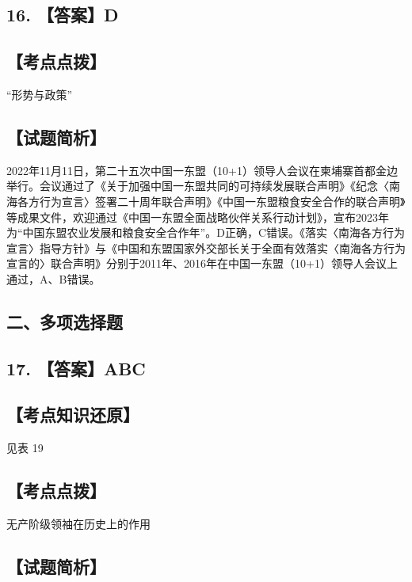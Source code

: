 \documentclass[UTF8,11pt]{ctexart}
\begin{document}
\subsection*{16. 【答案】D}

\subsection*{【考点点拨】}

“形势与政策”


\subsection*{【试题简析】}

2022年11月11日，第二十五次中国一东盟（10+1）领导人会议在柬埔寨首都金边举行。会议通过了《关于加强中国一东盟共同的可持续发展联合声明》《纪念〈南海各方行为宣言〉签署二十周年联合声明》《中国一东盟粮食安全合作的联合声明》等成果文件，欢迎通过《中国一东盟全面战略伙伴关系行动计划》，宣布2023年为“中国东盟农业发展和粮食安全合作年”。D正确，C错误。《落实〈南海各方行为宣言〉指导方针》与《中国和东盟国家外交部长关于全面有效落实〈南海各方行为宣言的〉联合声明》分别于2011年、2016年在中国一东盟（10+1）领导人会议上通过，A、B错误。


\subsection*{二、多项选择题}

\subsection*{17. 【答案】ABC}

\subsection*{【考点知识还原】}

见表 19


\subsection*{【考点点拨】}

无产阶级领袖在历史上的作用


\subsection*{【试题简析】}
\end{document}
